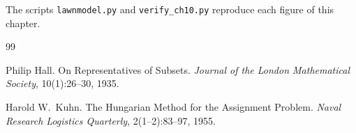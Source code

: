 \documentclass[11pt,twoside,openright]{book}
\theoremstyle{plain}
\theoremstyle{definition}
\theoremstyle{remark}
\begin{document}
The scripts \texttt{lawnmodel.py} and \texttt{verify\_ch10.py} reproduce each figure of this chapter.

\begin{thebibliography}{99}

Philip Hall.
\newblock On Representatives of Subsets.
\newblock \emph{Journal of the London Mathematical Society}, 10(1):26--30, 1935.

Harold W.\ Kuhn.
\newblock The Hungarian Method for the Assignment Problem.
\newblock \emph{Naval Research Logistics Quarterly}, 2(1--2):83--97, 1955.

\end{thebibliography}
\end{document}
